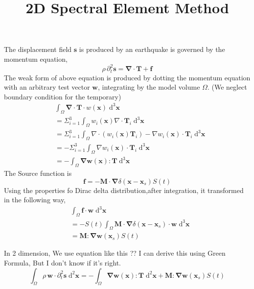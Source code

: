 \documentclass{book}
\title{2D Spectral Element Method}
\begin{document}
  The displacement field $\boldsymbol{s}$ is produced by an earthquake is governed by the momentum equation,
  \begin{equation}
  \rho\,\partial_t^2\boldsymbol{s}=\boldsymbol{\nabla}\cdot\boldsymbol{T}+\boldsymbol{f}
  \end{equation}
  The weak form of above equation is produced by dotting the momentum equation with an arbitrary test vector $\boldsymbol{w}$, integrating by the model volume $\Omega$. (We neglect boundary condition for the temporary)
  \begin{align*}
  &\int_\Omega \boldsymbol{\nabla}\cdot\boldsymbol{T}\cdot w(\boldsymbol{x})\;\mathrm{d}^3\boldsymbol{x}\\
  & = \Sigma _{i=1}^3\int_\Omega w_i(\boldsymbol{x})\nabla\cdot\boldsymbol{T}_i\;\mathrm{d}^3\boldsymbol{x}\\
  & = \Sigma_{i=1}^3\int_\Omega \nabla\cdot(w_i(\boldsymbol{x})\boldsymbol{T}_i) - \nabla w_i(\boldsymbol x) \cdot\boldsymbol T_i\;\mathrm{d}^3\boldsymbol{x}\\
  & = -\Sigma_{i=1}^3\int_\Omega\nabla w_i(\boldsymbol x) \cdot\boldsymbol T_i\;\mathrm{d}^3\boldsymbol{x}\\
  & = -\int_\Omega \boldsymbol{\nabla}\boldsymbol w(\boldsymbol x): \boldsymbol T\;\mathrm{d}^3\boldsymbol x
  \end{align*}
The Source function is 
\begin{equation}
 \boldsymbol{f} = -\boldsymbol{M}\cdot\boldsymbol\nabla\delta(\boldsymbol x-\boldsymbol x_s)S(t)
\end{equation}
Using the properties fo Dirac delta distribution,after integration, it transformed in the following way,
\begin{align*}
 &\int_\Omega \boldsymbol f\cdot \boldsymbol w\;\mathrm{d}^3\boldsymbol x\\
 &= -S(t)\int_\Omega\boldsymbol{M}\cdot \boldsymbol\nabla\delta(\boldsymbol x-\boldsymbol x_s)\cdot \boldsymbol w\;\mathrm{d}^3\boldsymbol x\\
 &= \boldsymbol{M}:\boldsymbol{\nabla w}(\boldsymbol x_s)S (t)
\end{align*}

In 2 dimension, We use equation like this ?? I can derive this using Green Formula, But I don't know if it's right. 
\begin{equation}
 \int_\Omega \rho\,\boldsymbol w\cdot \partial_t^2\boldsymbol s\;\mathrm{d}^2\boldsymbol x = -\int_\Omega \boldsymbol{\nabla}\boldsymbol w(\boldsymbol x): \boldsymbol T\;\mathrm{d}^2\boldsymbol x + \boldsymbol{M}:\boldsymbol{\nabla w}(\boldsymbol x_s)S (t)
\end{equation}








  
\end{document}
